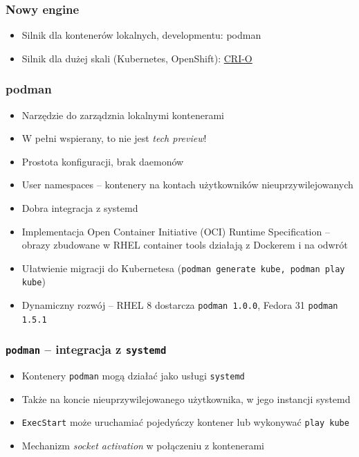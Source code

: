 \documentclass[dvipsnames,table]{beamer}
\begin{document}
\begin{frame}
	\frametitle{Nowy engine}
	\begin{itemize}
		\item Silnik dla kontenerów lokalnych, developmentu: podman
		\item Silnik dla dużej skali (Kubernetes, OpenShift): \href{https://cri-o.io/}{CRI-O}
	\end{itemize}
\end{frame}


\begin{frame}
	\frametitle{podman}
	\begin{itemize}
		\item Narzędzie do zarządznia lokalnymi kontenerami
		\item W pełni wspierany, to nie jest {\em tech preview}!
		\item Prostota konfiguracji, brak daemonów
		\item User namespaces -- kontenery na kontach użytkowników nieuprzywilejowanych
		\item Dobra integracja z systemd
		\item Implementacja Open Container Initiative (OCI) Runtime Specification -- obrazy zbudowane w RHEL container tools działają z Dockerem i na odwrót
		\item Ułatwienie migracji do Kubernetesa ({\tt podman generate kube, podman play kube})
		\item Dynamiczny rozwój -- RHEL 8 dostarcza {\tt podman 1.0.0}, Fedora 31 {\tt podman 1.5.1}
	\end{itemize}
\end{frame}

\begin{frame}[fragile]
	\frametitle{{\tt podman} -- integracja z {\tt systemd}}
	\begin{itemize}
		\item Kontenery {\tt podman} mogą działać jako usługi {\tt systemd}
		\item Także na koncie nieuprzywilejowanego użytkownika, w jego instancji systemd
		\item {\tt ExecStart} może uruchamiać pojedyńczy kontener lub wykonywać {\tt play kube}
		\item Mechanizm {\em socket activation} w połączeniu z kontenerami
	\end{itemize}
%
\end{frame}
\end{document}

